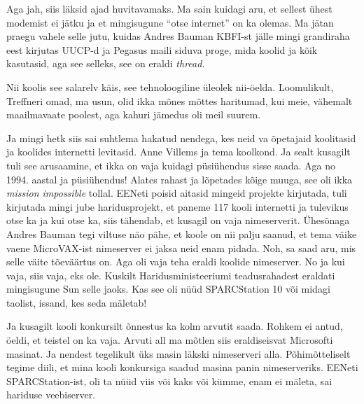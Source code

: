 Aga jah, siis läksid ajad huvitavamaks. Ma sain kuidagi aru, et sellest ühest modemist ei jätku ja et mingisugune \enquote{otse internet} on ka olemas. Ma jätan praegu vahele selle jutu, kuidas Andres Bauman KBFI-st jälle mingi grandiraha eest kirjutas UUCP-d ja Pegasus maili siduva proge, mida koolid ja kõik kasutasid, aga see selleks, see on eraldi \emph{thread}. 

Nii koolis see salarelv käis, see tehnoloogiline üleolek nii-öelda. Loomulikult, Treffneri omad, ma usun, olid ikka mõnes mõttes haritumad, kui meie, vähemalt maailmavaate poolest, aga kahuri jämedus oli meil suurem. 

Ja mingi hetk siis sai suhtlema hakatud nendega, kes neid va õpetajaid koolitasid ja koolides internetti levitasid. Anne Villems ja tema  koolkond. Ja sealt kusagilt tuli see arusaamine, et ikka on vaja kuidagi püsiühendus sisse saada. Aga no 1994. aastal ja püsiühendus! Alates rahast ja lõpetades kõige muuga, see oli ikka \emph{mission impossible} tollal. EENeti poisid aitasid mingeid projekte kirjutada, tuli kirjutada mingi jube haridusprojekt, et paneme 117 kooli internetti ja tulevikus otse ka ja kui otse ka, siis tähendab, et kusagil on vaja nimeserverit. Ühesõnaga Andres Bauman tegi viltuse näo pähe, et koole on nii palju saanud, et tema väike vaene MicroVAX-ist nimeserver ei jaksa neid enam pidada. Noh, sa saad aru, mis selle väite tõeväärtus on. Aga oli vaja teha eraldi koolide nimeserver. No ja kui vaja, siis vaja, eks ole. Kuskilt Haridusministeeriumi teadusrahadest eraldati mingisugune Sun selle jaoks. Kas see oli nüüd SPARCStation 10 või midagi taolist, issand, kes seda mäletab! 

Ja kusagilt kooli konkursilt õnnestus ka kolm arvutit saada. Rohkem ei antud, öeldi, et teistel on ka vaja. Arvuti all ma  mõtlen siis eraldiseisvat Microsofti masinat. Ja nendest  tegelikult üks masin läkski nimeserveri alla. Põhimõtteliselt tegime diili, et mina kooli konkursiga saadud masina panin nimeserveriks. EENeti SPARCStation-ist, oli ta nüüd viis või kaks või kümme, enam ei mäleta, sai hariduse veebiserver. 

